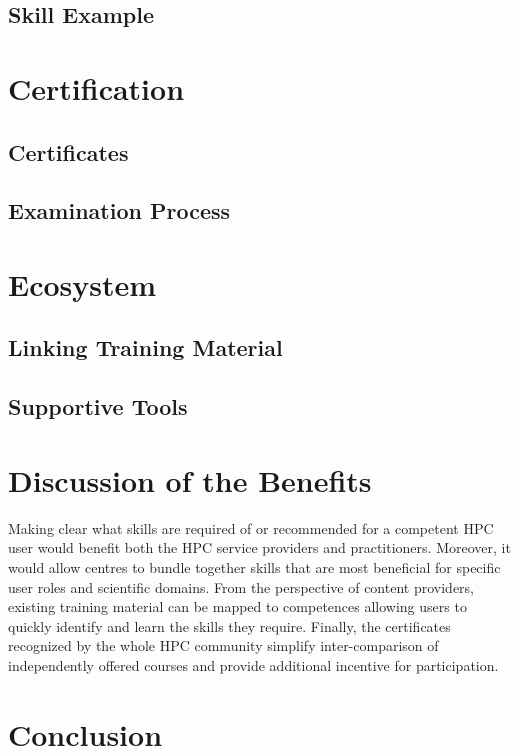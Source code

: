 \documentclass[jocse]{jocseart}
\begin{document}
\subsection{Skill Example}

\section{Certification}

\subsection{Certificates}

\subsection{Examination Process}

\section{Ecosystem}

\subsection{Linking Training Material}

\subsection{Supportive Tools}

\section{Discussion of the Benefits}

Making clear what skills are required of or recommended for a competent HPC user would benefit both the HPC service providers and practitioners.
Moreover, it would allow centres to bundle together skills that are most beneficial for specific user roles and scientific domains.
From the perspective of content providers, existing training material can be mapped to competences allowing users to quickly identify and learn the skills they require.
Finally, the certificates recognized by the whole HPC community simplify inter-comparison of independently offered courses and provide additional incentive for participation.


\section{Conclusion}
\end{document}
